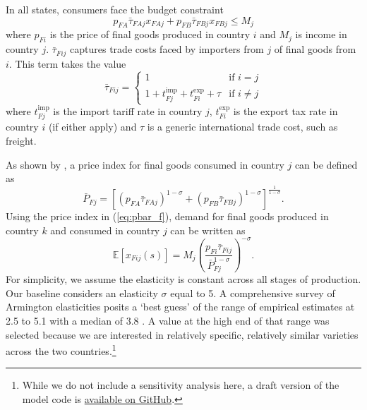 \documentclass{article}
\begin{document}
In all states, consumers face the budget constraint 
\begin{equation}
    p_{FA} \bar{\tau}_{FAj} x_{FAj} + p_{FB} \bar{\tau}_{FBj} x_{FBj} \leq M_j
\end{equation}
where $p_{Fi}$ is the price of final goods produced in country $i$ and $M_j$ is income in country $j$. $\bar{\tau}_{Fij}$ captures trade costs faced by importers from $j$ of final goods from $i$. This term takes the value 
\begin{equation} \label{eq:tau}
    \bar{\tau}_{Fij} =
    \begin{cases}
        1 &\text{if } i = j \\
        1 + t^{\text{imp}}_{Fj} + t^{\text{exp}}_{Fi} + \tau &\text{if } i \neq j
    \end{cases}
\end{equation}
where $t^{\text{imp}}_{Fj}$ is the import tariff rate in country $j$, $t^{\text{exp}}_{Fi}$ is the export tax rate in country $i$ (if either apply) and $\tau$ is a generic international trade cost, such as freight.

As shown by \textcite{dixit_monopolistic_1977}, a price index for final goods consumed in country $j$ can be defined as
\begin{equation} \label{eq:pbar_f}
      \bar{P}_{Fj} = \left[ (p_{FA} \bar{\tau}_{FAj} )^{1-\sigma} +  (p_{FB} \bar{\tau}_{FBj})^{1-\sigma} \right]^\frac{1}{1-\sigma} .
\end{equation}
Using the price index in (\ref{eq:pbar_f}), demand for final goods produced in country $k$ and consumed in country $j$ can be written as
\begin{equation}
    \mathbb{E} \left[ x_{Fij}(s) \right] = M_j \left( \frac{p_{Fi} \bar{\tau}_{Fij}}{\bar{P}_{Fj}^{1 - \sigma}}  \right)^{-\sigma} .
\end{equation}
For simplicity, we assume the elasticity is constant across all stages of production. Our baseline considers an elasticity $\sigma$ equal to 5. A comprehensive survey of Armington elasticities posits a `best guess' of the range of empirical estimates at 2.5 to 5.1 with a median of 3.8 \parencite{bajzik_estimating_2020}. A value at the high end of that range was selected because we are interested in relatively specific, relatively similar varieties across the two countries.\footnote{While we do not include a sensitivity analysis here, a draft version of the model code is \href{https://github.com/sjhardwick/supply_chains}{available on GitHub}.}
\end{document}
